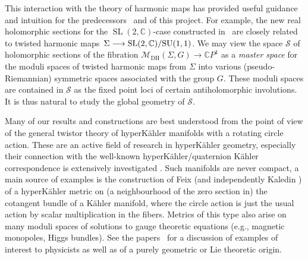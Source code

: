 \documentclass[pdftex]{sigma}
\numberwithin{equation}{section}
\theoremstyle{definition}
\newcommand\C{{\mathbb C}}
\begin{document}
This interaction with the theory of harmonic maps has provided useful guidance and intuition for the
predecessors~\cite{BHR} and \cite{BeHeRo} of this project. For example, the new real holomorphic sections for the
$\operatorname{SL}(2,\C)$-case constructed in~\cite{BHR} are closely related to twisted harmonic maps~${\Sigma \longrightarrow
\operatorname{SL}(2,\C)/{\rm SU}(1,1)}$.
We may view the
space $\mathcal S$ of holomorphic sections of the fibration $\mathcal{M}_{\mathrm{DH}}(\Sigma,G) \longrightarrow \C P^1$ as a \emph{master space}
for the moduli spaces of twisted harmonic maps from $\Sigma$ into various (pseudo-Riemannian) symmetric spaces
associated with the group $G$. These moduli spaces are contained in $\mathcal S$ as the fixed point loci of certain antiholomorphic involutions. It is thus natural to study the global geometry of $\mathcal S$.

Many of our results and constructions are best understood from the point of view of the general twistor theory of hyperK\"ahler manifolds with a rotating circle action. These are an active field of research in hyperK\"ahler geometry,
especially their connection with the well-known hyperK\"ahler/quaternion K\"ahler correspondence is extensively investigated \cite{ACM,Haydys,Hitchin-HKQK,Hitchin-HKQK2}. Such manifolds are never compact, a main source of examples is the construction of Feix \cite{Fei01} (and independently Kaledin \cite{Kaledin}) of a hyperK\"ahler metric on (a neighbourhood of the zero section in) the cotangent bundle of a K\"ahler manifold, where the circle action is just the usual action by scalar multiplication in the fibers. Metrics of this type also arise on many moduli spaces of solutions to gauge theoretic equations (e.g., magnetic monopoles, Higgs bundles). See the papers~\cite{Hitchin-HKQK,Hitchin-HKQK2} for a discussion of examples of interest to physicists as well as of a purely geometric or Lie theoretic origin.
\end{document}
